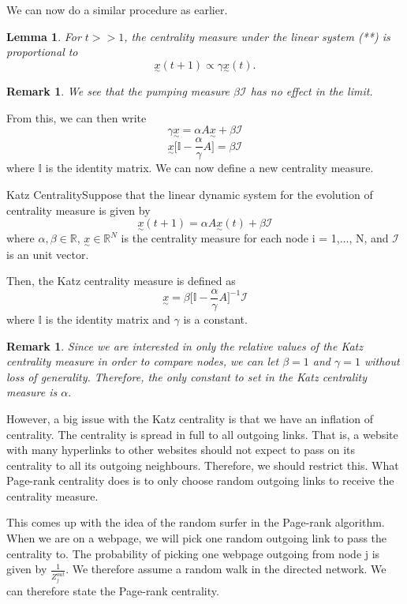 \documentclass[twoside]{article}
\newcommand{\utilde}{\underset{\sim}}
\newtheorem{lemma}[theorem]{Lemma}
\newtheorem{remark}[theorem]{Remark}
\begin{document}
We can now do a similar procedure as earlier.
\begin{lemma}For $t > > 1$, the centrality measure under the linear system (**) is proportional to
$$
\utilde{x}(t + 1) \propto \gamma \utilde{x}(t).
$$
\end{lemma}

\begin{remark}We see that the pumping measure $\beta \mathcal{I}$ has no effect in the limit.
\end{remark}

From this, we can then write 
$$
\gamma \utilde{x} = \alpha A \utilde{x} + \beta \mathcal{I}
$$
$$
\utilde{x}\bigg[\mathbb{I} - \frac{\alpha}{\gamma}A \bigg] = \beta \mathcal{I}
$$
where $\mathbb{I}$ is the identity matrix. We can now define a new centrality measure.

\begin{definition_exam}{Katz Centrality}{}Suppose that the linear dynamic system for the evolution of centrality measure is given by 
$$
\utilde{x}(t + 1) = \alpha A \utilde{x}(t) + \beta \mathcal{I}
$$
where $\alpha, \beta \in \mathbb{R}$, $\utilde{x} \in \mathbb{R}^N$ is the centrality measure for each node i = 1,..., N, and $\mathcal{I}$ is an unit vector.

Then, the Katz centrality measure is defined as 
$$
\utilde{x} = \beta\bigg[\mathbb{I} - \frac{\alpha}{\gamma}A \bigg]^{-1} \mathcal{I}
$$
where $\mathbb{I}$ is the identity matrix and $\gamma$ is a constant.
\end{definition_exam}

\begin{remark}Since we are interested in only the relative values of the Katz centrality measure in order to compare nodes, we can let $\beta = 1$ and $\gamma = 1$ without loss of generality. Therefore, the only constant to set in the Katz centrality measure is $\alpha.$
\end{remark}

However, a big issue with the Katz centrality is that we have an inflation of centrality. The centrality is spread in full to all outgoing links. That is, a website with many hyperlinks to other websites should not expect to pass on its centrality to all its outgoing neighbours. Therefore, we should restrict this. What Page-rank centrality does is to only choose random outgoing links to receive the centrality measure.

This comes up with the idea of the random surfer in the Page-rank algorithm. When we are on a webpage, we will pick one random outgoing link to pass the centrality to. The probability of picking one webpage outgoing from node j is given by $\frac{1}{Z_j^{out}}$. We therefore assume a random walk in the directed network. We can therefore state the Page-rank centrality.
\end{document}
